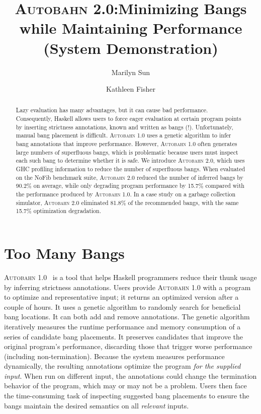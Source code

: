 \documentclass[sigplan,screen]{acmart}
\newcommand{\Ao}[0]{\textsc{Autobahn 1.0}}
\newcommand{\At}[0]{\textsc{Autobahn 2.0}}
\begin{document}
\title[\At{}: Minimizing Bangs\ldots (System Demonstration)]{\At:\break Minimizing Bangs while Maintaining Performance
  (System Demonstration)}
\author{Marilyn Sun}

\author{Kathleen Fisher}
\begin{abstract}

Lazy evaluation has many advantages, but it can cause bad
performance. Consequently, Haskell allows users to
force eager evaluation at certain program points by inserting
strictness annotations, known and written as bangs (!).
Unfortunately, manual bang placement
is difficult. \Ao{}
uses a genetic algorithm to infer bang annotations
that improve performance. However, \Ao{} often generates
large numbers of superfluous bangs,
which is problematic because users must inspect each such bang to
determine whether it is safe.
We introduce \At, which uses GHC
profiling information to reduce the number of superfluous bangs.
When evaluated on the NoFib benchmark suite, 
\At{} reduced the number of inferred bangs by 90.2\% on average,
while only degrading program performance by 15.7\% compared with the
performance produced by \Ao{}. 
In a case study on a garbage collection simulator, 
\At{} eliminated 81.8\% of the recommended bangs, with the 
same 15.7\% optimization degradation.
\end{abstract}
\maketitle

\section{Too Many Bangs}

\Ao~\cite{autobahn-wang} is a tool that helps Haskell programmers 
reduce their thunk usage by inferring strictness
annotations. Users provide \Ao{} with a
program to optimize and representative input; it returns
an optimized version after a couple of hours.
It uses a genetic algorithm to randomly search for
beneficial bang locations. It can 
both add and remove annotations.
The genetic
algorithm iteratively measures the runtime performance and memory
consumption of a series of 
candidate bang placements. It preserves candidates that improve the original
program's performance, discarding those that trigger worse performance
(including non-termination).
Because the system  measures performance dynamically, the resulting
annotations optimize the program 
\textit{for the supplied input}.  When run on different input, the
annotations could change the termination behavior of the program,
which may or may not be a problem.
Users then face the time-consuming task of inspecting suggested bang placements
to ensure the bangs maintain the desired semantics on all \textit{relevant}
inputs.  
\end{document}
